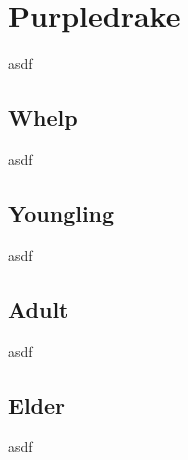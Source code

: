 \section{Purpledrake}

asdf

\subsection{Whelp}

asdf

\subsection{Youngling}

asdf

\subsection{Adult}

asdf

\subsection{Elder}

asdf